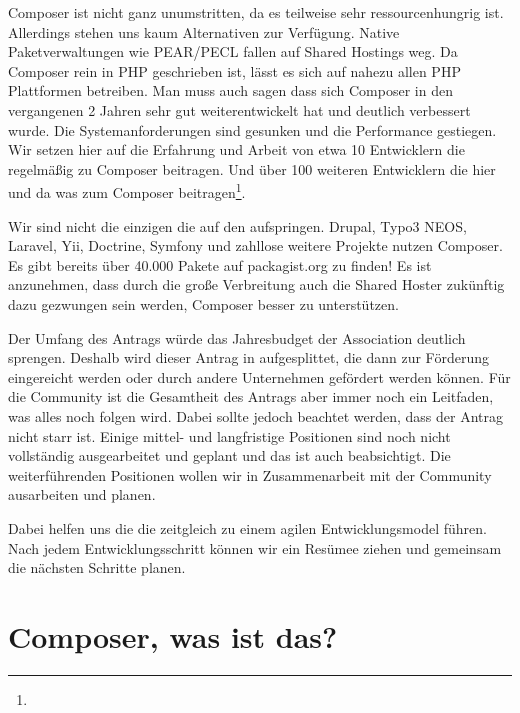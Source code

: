 \documentclass[
paper=a4,
draft=false,%
fontsize=10pt%
]{scrartcl}
\begin{document}
Composer ist nicht ganz unumstritten, da es teilweise sehr ressourcenhungrig ist. Allerdings stehen uns kaum Alternativen zur Verfügung. Native Paketverwaltungen wie PEAR/PECL fallen auf Shared Hostings weg. Da Composer rein in PHP geschrieben ist, lässt es sich auf nahezu allen PHP Plattformen betreiben. Man muss auch sagen dass sich Composer in den vergangenen 2 Jahren sehr gut weiterentwickelt hat und deutlich verbessert wurde. Die Systemanforderungen sind gesunken und die Performance gestiegen. Wir setzen hier auf die Erfahrung und Arbeit von etwa 10 Entwicklern die regelmäßig zu Composer beitragen. Und über 100 weiteren Entwicklern die hier und da was zum Composer beitragen\footnote{}.

Wir sind nicht die einzigen die auf den  aufspringen. Drupal, Typo3 NEOS, Laravel, Yii, Doctrine, Symfony und zahllose weitere Projekte nutzen Composer. Es gibt bereits über 40.000 Pakete auf packagist.org zu finden! Es ist anzunehmen, dass durch die große Verbreitung auch die Shared Hoster zukünftig dazu gezwungen sein werden, Composer besser zu unterstützen.

Der Umfang des Antrags würde das Jahresbudget der Association deutlich sprengen. Deshalb wird dieser Antrag in  aufgesplittet, die dann zur Förderung eingereicht werden oder durch andere Unternehmen gefördert werden können.
Für die Community ist die Gesamtheit des Antrags aber immer noch ein Leitfaden, was alles noch folgen wird.
Dabei sollte jedoch beachtet werden, dass der Antrag nicht starr ist. Einige mittel- und langfristige Positionen sind noch nicht vollständig ausgearbeitet und geplant und das ist auch beabsichtigt. Die weiterführenden Positionen wollen wir in Zusammenarbeit mit der Community ausarbeiten und planen.

Dabei helfen uns die  die zeitgleich zu einem agilen Entwicklungsmodel führen. Nach jedem Entwicklungsschritt können wir ein Resümee ziehen und gemeinsam die nächsten Schritte planen.

\newpage

%
%

\section{Composer, was ist das?}
\label{sec:why-composer}
\end{document}
